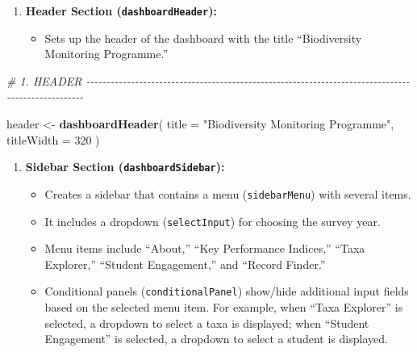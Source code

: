 \documentclass[
]{book}
\newenvironment{Shaded}{\begin{snugshade}}{\end{snugshade}}
\newcommand{\AttributeTok}[1]{\textcolor[rgb]{0.13,0.29,0.53}{#1}}
\newcommand{\CommentTok}[1]{\textcolor[rgb]{0.56,0.35,0.01}{\textit{#1}}}
\newcommand{\DecValTok}[1]{\textcolor[rgb]{0.00,0.00,0.81}{#1}}
\newcommand{\FunctionTok}[1]{\textcolor[rgb]{0.13,0.29,0.53}{\textbf{#1}}}
\newcommand{\NormalTok}[1]{#1}
\newcommand{\OtherTok}[1]{\textcolor[rgb]{0.56,0.35,0.01}{#1}}
\newcommand{\StringTok}[1]{\textcolor[rgb]{0.31,0.60,0.02}{#1}}
\providecommand{\tightlist}{%
  \setlength{\itemsep}{0pt}\setlength{\parskip}{0pt}}
\begin{document}
\begin{enumerate}
\def\labelenumi{\arabic{enumi}.}
\tightlist
\item
  \textbf{Header Section (\texttt{dashboardHeader}):}

  \begin{itemize}
  \tightlist
  \item
    Sets up the header of the dashboard with the title ``Biodiversity Monitoring Programme.''
  \end{itemize}
\end{enumerate}

\begin{Shaded}
\begin{Highlighting}[]
\CommentTok{\# 1. HEADER {-}{-}{-}{-}{-}{-}{-}{-}{-}{-}{-}{-}{-}{-}{-}{-}{-}{-}{-}{-}{-}{-}{-}{-}{-}{-}{-}{-}{-}{-}{-}{-}{-}{-}{-}{-}{-}{-}{-}{-}{-}{-}{-}{-}{-}{-}{-}{-}{-}{-}{-}{-}{-}{-}{-}{-}{-}{-}{-}{-}{-}{-}{-}{-}{-}{-}{-}{-}{-}{-}{-}{-}{-}{-}{-}{-}{-}{-}{-}{-}{-}{-}{-}{-}{-}{-}{-}{-}{-}{-}{-}{-}{-}{-}{-}{-}{-}{-}{-}}

\NormalTok{header }\OtherTok{\textless{}{-}} \FunctionTok{dashboardHeader}\NormalTok{(}
  \AttributeTok{title =} \StringTok{"Biodiversity Monitoring Programme"}\NormalTok{,}
  \AttributeTok{titleWidth =} \DecValTok{320}
\NormalTok{)}
\end{Highlighting}
\end{Shaded}

\begin{enumerate}
\def\labelenumi{\arabic{enumi}.}
\setcounter{enumi}{1}
\tightlist
\item
  \textbf{Sidebar Section (\texttt{dashboardSidebar}):}

  \begin{itemize}
  \tightlist
  \item
    Creates a sidebar that contains a menu (\texttt{sidebarMenu}) with several items.
  \item
    It includes a dropdown (\texttt{selectInput}) for choosing the survey year.
  \item
    Menu items include ``About,'' ``Key Performance Indices,'' ``Taxa Explorer,'' ``Student Engagement,'' and ``Record Finder.''
  \item
    Conditional panels (\texttt{conditionalPanel}) show/hide additional input fields based on the selected menu item. For example, when ``Taxa Explorer'' is selected, a dropdown to select a taxa is displayed; when ``Student Engagement'' is selected, a dropdown to select a student is displayed.
  \end{itemize}
\end{enumerate}
\end{document}
